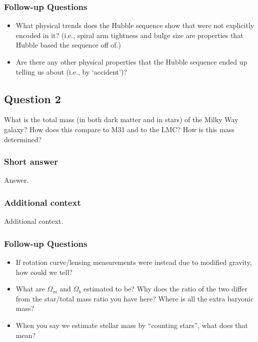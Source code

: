 \documentclass[a4paper,11pt]{article}
\begin{document}
\subsubsection{Follow-up Questions}

\begin{itemize}
    \item What physical trends does the Hubble sequence show that were not explicitly encoded in it? (i.e., spiral arm tightness and bulge size are properties that Hubble based the sequence off of.)
    \item Are there any other physical properties that the Hubble sequence ended up telling us about (i.e., by `accident')?
\end{itemize}



\newpage
\subsection{Question 2}

What is the total mass (in both dark matter and in stars) of the Milky Way galaxy? How does this compare to M31 and to the LMC? How is this mass determined?

\subsubsection{Short answer}

Answer.

\subsubsection{Additional context}

Additional context.

\subsubsection{Follow-up Questions}

\begin{itemize}
    \item If rotation curve/lensing measurements were instead due to modified gravity, how could we tell?
    \item What are $\Omega_m$ and $\Omega_b$ estimated to be? Why does the ratio of the two differ from the star/total mass ratio you have here? Where is all the extra baryonic mass?
    \item When you say we estimate stellar mass by ``counting stars'', what does that mean?
\end{itemize}
\end{document}
